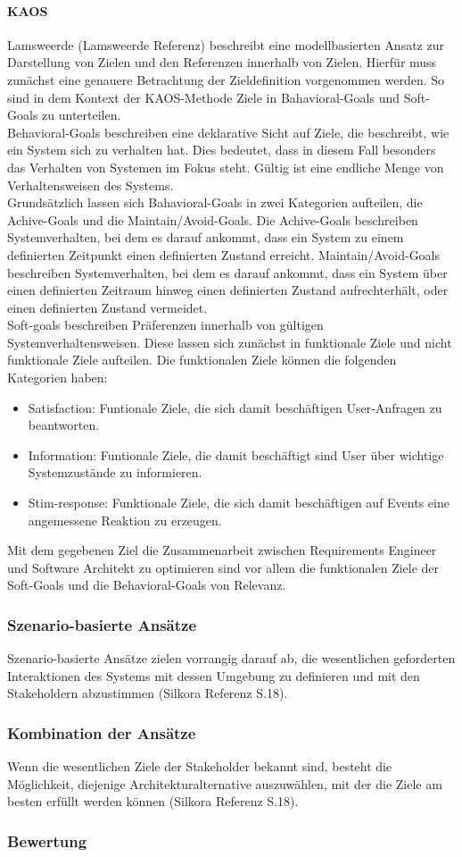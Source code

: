 \paragraph{KAOS}
Lamsweerde (Lamsweerde Referenz) beschreibt eine modellbasierten Ansatz zur Darstellung von Zielen und den Referenzen innerhalb von Zielen. Hierfür muss zunächst eine genauere Betrachtung der Zieldefinition vorgenommen werden. So sind in dem Kontext der KAOS-Methode Ziele in Bahavioral-Goals und Soft-Goals zu unterteilen. \\
Behavioral-Goals beschreiben eine deklarative Sicht auf Ziele, die beschreibt, wie ein System sich zu verhalten hat. Dies bedeutet, dass in diesem Fall besonders das Verhalten von Systemen im Fokus steht. Gültig ist eine endliche Menge von Verhaltensweisen des Systems. \\
Grundsätzlich lassen sich Bahavioral-Goals in zwei Kategorien aufteilen, die Achive-Goals und die Maintain/Avoid-Goals. Die Achive-Goals beschreiben Systemverhalten, bei dem es darauf ankommt, dass ein System zu einem definierten Zeitpunkt einen definierten Zustand erreicht. Maintain/Avoid-Goals beschreiben Systemverhalten, bei dem es darauf ankommt, dass ein System über einen definierten Zeitraum hinweg einen definierten Zustand aufrechterhält, oder einen definierten Zustand vermeidet.\\
Soft-goals beschreiben Präferenzen innerhalb von gültigen Systemverhaltensweisen. Diese lassen sich zunächst in funktionale Ziele und nicht funktionale Ziele aufteilen. Die funktionalen Ziele können die folgenden Kategorien haben:
\begin{itemize}
\item Satisfaction: Funtionale Ziele, die sich damit beschäftigen User-Anfragen zu beantworten.
\item Information: Funtionale Ziele, die damit beschäftigt sind User über wichtige Systemzustände zu informieren.
\item Stim-response: Funktionale Ziele, die sich damit beschäftigen auf Events eine angemessene Reaktion zu erzeugen.
\end{itemize}
Mit dem gegebenen Ziel die Zusammenarbeit zwischen Requirements Engineer und Software Architekt zu optimieren sind vor allem die funktionalen Ziele der Soft-Goals und die Behavioral-Goals von Relevanz.
\subsubsection{Szenario-basierte Ansätze}
Szenario-basierte Ansätze zielen vorrangig darauf ab, die wesentlichen geforderten Interaktionen des Systems mit dessen Umgebung zu definieren und mit den Stakeholdern abzustimmen (Silkora Referenz S.18).
\subsubsection{Kombination der Ansätze}
Wenn die wesentlichen Ziele der Stakeholder bekannt sind, besteht die Möglichkeit, diejenige Architekturalternative auszuwählen, mit der die Ziele am besten erfüllt werden können (Silkora Referenz S.18).
\subsubsection{Bewertung}
